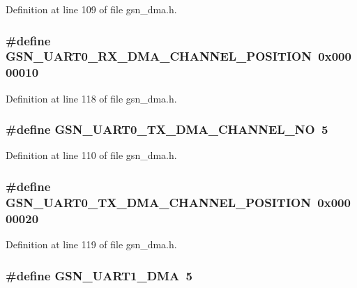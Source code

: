 Definition at line 109 of file gsn\_\-dma.h.

\hypertarget{a00484_a6ab75e48baf9d4d47f57acb2ad5d5e4e}{
\subsubsection[{GSN\_\-UART0\_\-RX\_\-DMA\_\-CHANNEL\_\-POSITION}]{\setlength{\rightskip}{0pt plus 5cm}\#define GSN\_\-UART0\_\-RX\_\-DMA\_\-CHANNEL\_\-POSITION~0x00000010}}
\label{a00484_a6ab75e48baf9d4d47f57acb2ad5d5e4e}


Definition at line 118 of file gsn\_\-dma.h.

\hypertarget{a00484_afe69dfdc5c1d8da565f80843224d4400}{
\subsubsection[{GSN\_\-UART0\_\-TX\_\-DMA\_\-CHANNEL\_\-NO}]{\setlength{\rightskip}{0pt plus 5cm}\#define GSN\_\-UART0\_\-TX\_\-DMA\_\-CHANNEL\_\-NO~5}}
\label{a00484_afe69dfdc5c1d8da565f80843224d4400}


Definition at line 110 of file gsn\_\-dma.h.

\hypertarget{a00484_a6feeadb8169a6419cac6c600fdb1578a}{
\subsubsection[{GSN\_\-UART0\_\-TX\_\-DMA\_\-CHANNEL\_\-POSITION}]{\setlength{\rightskip}{0pt plus 5cm}\#define GSN\_\-UART0\_\-TX\_\-DMA\_\-CHANNEL\_\-POSITION~0x00000020}}
\label{a00484_a6feeadb8169a6419cac6c600fdb1578a}


Definition at line 119 of file gsn\_\-dma.h.

\hypertarget{a00484_a94eeeed32bfd2b1263bd50406eaa1b25}{
\subsubsection[{GSN\_\-UART1\_\-DMA}]{\setlength{\rightskip}{0pt plus 5cm}\#define GSN\_\-UART1\_\-DMA~5}}
\label{a00484_a94eeeed32bfd2b1263bd50406eaa1b25}


